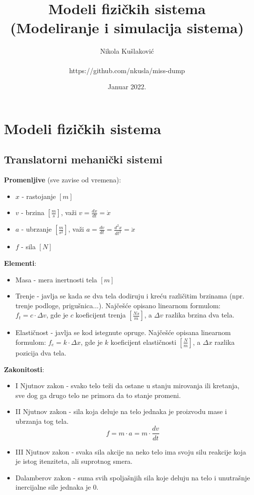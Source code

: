 \documentclass[10pt]{report}
\title{\bf Modeli fizičkih sistema \\ (Modeliranje i simulacija sistema)}
\author{Nikola Kušlaković\\\\
https://github.com/nkusla/miss-dump}
\date{Januar 2022.}
\begin{document}
	\maketitle

	\chapter*{Modeli fizičkih sistema}

	\section*{Translatorni mehanički sistemi}

		\textbf{Promenljive} (sve zavise od vremena):
		\begin{itemize}
			\item $x$ - rastojanje $[m]$
			\item $v$ - brzina $[\frac{m}{s}]$, važi $v=\frac{dx}{dt}=\dot{x}$
			\item $a$ - ubrzanje $[\frac{m}{s^2}]$, važi $a=\frac{dv}{dt}=\frac{d^2x}{dt^2}=\ddot{x}$
			\item $f$ - sila $[N]$
		\end{itemize}

		\textbf{Elementi}:
		\begin{itemize}
			\item Masa - mera inertnosti tela $[m]$
			\item Trenje - javlja se kada se dva tela dodiruju i kreću različitim brzinama (npr. trenje podloge, prigušnica...).
			Najčešće opisano linearnom formulom: $f_t = c \cdot \Delta v$, gde je $c$ koeficijent trenja $[\frac{Ns}{m}]$,
			a $\Delta v$ razlika brzina dva tela.
			\item Elastičnost - javlja se kod istegnute opruge. Najčešće opisana linearnom formulom: $f_e = k \cdot \Delta x$, gde je $k$
			koeficijent elastičnosti $[\frac{N}{m}]$, a $\Delta x$ razlika pozicija dva tela.
		\end{itemize}

		\textbf{Zakonitosti}:
		\begin{itemize}
			\item I Njutnov zakon - svako telo teži da ostane u stanju mirovanja ili kretanja, sve dog ga drugo telo ne primora da to stanje promeni.
			\item II Njutnov zakon - sila koja deluje na telo jednaka je proizvodu mase i ubrzanja tog tela.
			$$f = m \cdot a = m \cdot \frac{dv}{dt}$$
			\item III Njutnov zakon - svaka sila akcije na neko telo ima svoju silu reakcije koja je istog itenziteta, ali suprotnog smera.
			\item Dalamberov zakon - suma svih spoljašnjih sila koje deluju na telo i unutrašnje inercijalne sile jednaka je 0.
		\end{itemize}
\end{document}
